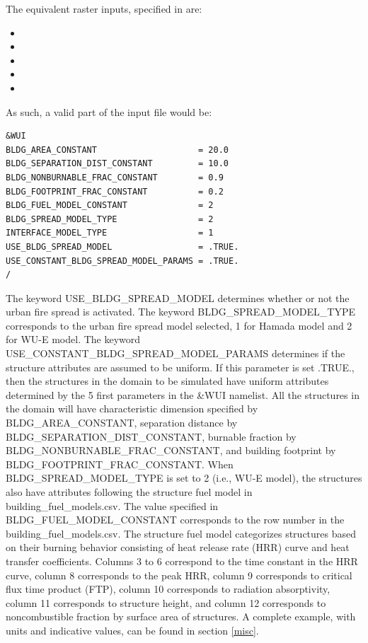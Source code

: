 The equivalent raster inputs, specified in  are:

\begin{itemize}
    \item {}
    \item {}
    \item {}
    \item {}
    \item {}
\end{itemize}

As such, a valid part of the input file would be:

\begin{verbatim}
&WUI
BLDG_AREA_CONSTANT                    = 20.0
BLDG_SEPARATION_DIST_CONSTANT         = 10.0
BLDG_NONBURNABLE_FRAC_CONSTANT        = 0.9
BLDG_FOOTPRINT_FRAC_CONSTANT          = 0.2
BLDG_FUEL_MODEL_CONSTANT              = 2
BLDG_SPREAD_MODEL_TYPE                = 2
INTERFACE_MODEL_TYPE                  = 1
USE_BLDG_SPREAD_MODEL                 = .TRUE.
USE_CONSTANT_BLDG_SPREAD_MODEL_PARAMS = .TRUE.
/
\end{verbatim}

The keyword USE\_BLDG\_SPREAD\_MODEL determines whether or not the urban fire spread is activated. The keyword BLDG\_SPREAD\_MODEL\_TYPE corresponds to the urban fire spread model selected, 1 for Hamada model and 2 for WU-E model. The keyword USE\_CONSTANT\_BLDG\_SPREAD\_MODEL\_PARAMS determines if the structure attributes are assumed to be uniform. If this parameter is set .TRUE., then the structures in the domain to be simulated have uniform attributes determined by the 5 first parameters in the \&WUI namelist. All the structures in the domain will have characteristic dimension specified by BLDG\_AREA\_CONSTANT, separation distance by BLDG\_SEPARATION\_DIST\_CONSTANT, burnable fraction by BLDG\_NONBURNABLE\_FRAC\_CONSTANT, and building footprint by BLDG\_FOOTPRINT\_FRAC\_CONSTANT. When BLDG\_SPREAD\_MODEL\_TYPE is set to 2 (i.e., WU-E model), the structures also have attributes following the structure fuel model in building\_fuel\_models.csv. The value specified in BLDG\_FUEL\_MODEL\_CONSTANT corresponds to the row number in the building\_fuel\_models.csv. The structure fuel model categorizes structures based on their burning behavior consisting of heat release rate (HRR) curve and heat transfer coefficients. Columns 3 to 6 correspond to the time constant in the HRR curve, column 8 corresponds to the peak HRR, column 9 corresponds to critical flux time product (FTP), column 10 corresponds to radiation absorptivity, column 11 corresponds to structure height, and column 12 corresponds to noncombustible fraction by surface area of structures. A complete example, with units and indicative values, can be found in section \ref{misc}.

